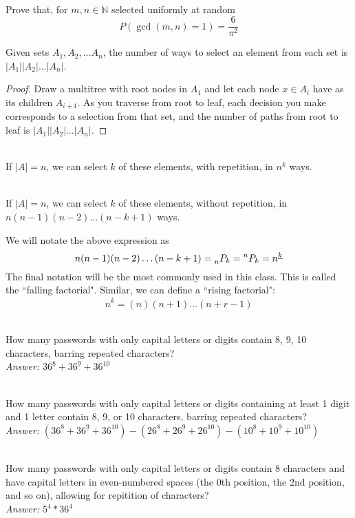 \begin{problem} \\
Prove that, for $m,n\in\mathbb{N}$ selected uniformly at random $$P(\gcd(m,n)=1) = \frac{6}{\pi^2}$$
\end{problem}
\begin{theorem}
Given sets $A_1, A_2, \dots A_n$, the number of ways to select an element from each set is $|A_1||A_2|\dots|A_n|$. 
\end{theorem}
\begin{proof}
Draw a multitree  with root nodes in $A_1$ and let each node $x\in A_i$ have as its children $A_{i+1}$. As you traverse from root to leaf, each decision you make corresponds to a selection from that set, and the number of paths from root to leaf is $|A_1||A_2|\dots|A_n|$.
\end{proof}
\begin{corollary}\\
If $|A| = n$, we can select $k$ of these elements, with repetition, in $n^k$ ways.
\end{corollary}
\begin{corollary}\\
If $|A| = n$, we can select $k$ of these elements, without repetition, in $n(n-1)(n-2)\dots (n-k+1)$ ways.
\end{corollary}
We will notate the above expression as 
$$n(n-1)(n-2)\dots(n-k+1) =\prescript{}{n}{P_k} = \prescript{n}{}{P_k}=n^{\underline{k}}$$
The final notation will be the most commonly used in this class. This is called the ``falling factorial". Similar, we can define a ``rising factorial":
$$n^{\overline{k}}=(n)(n+1)\dots(n+r-1)$$

\begin{problem}[Problem 1]\\
How many passwords with only capital letters or digits contain 8, 9, 10 characters, barring repeated characters?
\\ \emph{Answer:} $36^{\underline{8}}+36^{\underline{9}}+36^{\underline{10}}$
\end{problem}
\begin{problem}[Problem 2]\\
How many passwords with only capital letters or digits containing at least 1 digit and 1 letter contain 8, 9, or 10 characters, barring repeated characters?
\\ \emph{Answer:} $(36^{\underline{8}}+36^{\underline{9}}+36^{\underline{10}}) - (26^{\underline{8}}+26^{\underline{9}}+26^{\underline{10}}) - (10^{\underline{8}}+10^{\underline{9}}+10^{\underline{10}})$
\end{problem}
\begin{problem}[Problem 3]\\
How many passwords with only capital letters or digits contain 8 characters and have capital letters in even-numbered spaces (the 0th position, the 2nd position, and so on), allowing for repitition of characters? \\
\emph{Answer:} $5^4 * 36^4$
\end{problem}

